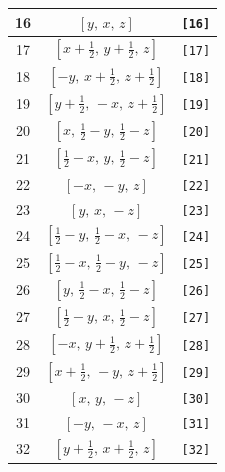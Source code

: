 \documentclass[fleqn,8pt]{jsarticle}
\begin{document}
\begin{longtable}{ccc}
16 & $\left[ y,\, x,\, z \right]$ & {\tt [16]} \\ \hline
17 & $\left[ x + \frac{1}{2},\, y + \frac{1}{2},\, z \right]$ & {\tt [17]} \\ \hline
18 & $\left[ - y,\, x + \frac{1}{2},\, z + \frac{1}{2} \right]$ & {\tt [18]} \\ \hline
19 & $\left[ y + \frac{1}{2},\, - x,\, z + \frac{1}{2} \right]$ & {\tt [19]} \\ \hline
20 & $\left[ x,\, \frac{1}{2} - y,\, \frac{1}{2} - z \right]$ & {\tt [20]} \\ \hline
21 & $\left[ \frac{1}{2} - x,\, y,\, \frac{1}{2} - z \right]$ & {\tt [21]} \\ \hline
22 & $\left[ - x,\, - y,\, z \right]$ & {\tt [22]} \\ \hline
23 & $\left[ y,\, x,\, - z \right]$ & {\tt [23]} \\ \hline
24 & $\left[ \frac{1}{2} - y,\, \frac{1}{2} - x,\, - z \right]$ & {\tt [24]} \\ \hline
25 & $\left[ \frac{1}{2} - x,\, \frac{1}{2} - y,\, - z \right]$ & {\tt [25]} \\ \hline
26 & $\left[ y,\, \frac{1}{2} - x,\, \frac{1}{2} - z \right]$ & {\tt [26]} \\ \hline
27 & $\left[ \frac{1}{2} - y,\, x,\, \frac{1}{2} - z \right]$ & {\tt [27]} \\ \hline
28 & $\left[ - x,\, y + \frac{1}{2},\, z + \frac{1}{2} \right]$ & {\tt [28]} \\ \hline
29 & $\left[ x + \frac{1}{2},\, - y,\, z + \frac{1}{2} \right]$ & {\tt [29]} \\ \hline
30 & $\left[ x,\, y,\, - z \right]$ & {\tt [30]} \\ \hline
31 & $\left[ - y,\, - x,\, z \right]$ & {\tt [31]} \\ \hline
32 & $\left[ y + \frac{1}{2},\, x + \frac{1}{2},\, z \right]$ & {\tt [32]} \\
\end{longtable}
\end{document}

